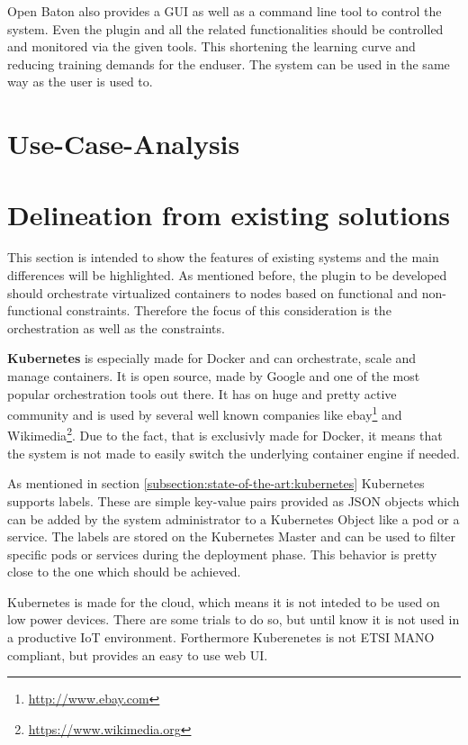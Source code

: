Open Baton also provides a \ac{GUI} as well as a command line tool to control the system.
Even the plugin and all the related functionalities should be controlled and monitored via the given tools.
This shortening the learning curve and reducing training demands for the enduser.
The system can be used in the same way as the user is used to.

\section{Use-Case-Analysis}
\doit

\section{Delineation from existing solutions}
This section is intended to show the features of existing systems and the main differences will be highlighted.
As mentioned before, the plugin to be developed should orchestrate virtualized containers to nodes based on functional and non-functional constraints.
Therefore the focus of this consideration is the orchestration as well as the constraints.

\textbf{Kubernetes} is especially made for Docker and can orchestrate, scale and manage containers.
It is open source, made by Google and one of the most popular orchestration tools out there.
It has on huge and pretty active community and is used by several well known companies\autocite{Kubernetes:Case-Studies} like ebay\footnote{\url{http://www.ebay.com}} and Wikimedia\footnote{\url{https://www.wikimedia.org}}.
Due to the fact, that is exclusivly made for Docker, it means that the system is not made to easily switch the underlying container engine if needed.

As mentioned in section \ref{subsection:state-of-the-art:kubernetes} Kubernetes supports labels.
These are simple key-value pairs provided as \ac{JSON} objects which can be added by the system administrator to a Kubernetes Object like a pod or a service.
The labels are stored on the Kubernetes Master and can be used to filter specific pods or services during the deployment phase.
This behavior is pretty close to the one which should be achieved.

Kubernetes is made for the cloud, which means it is not inteded to be used on low power devices.
There are some trials to do so, but until know it is not used in a productive \ac{IoT} environment.
Forthermore Kuberenetes is not \ac{ETSI} \ac{MANO} compliant, but provides an easy to use web \ac{UI}.

